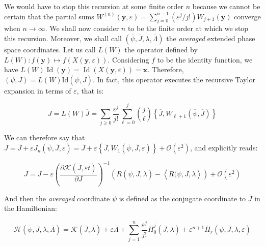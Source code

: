 \vspace*{2.5pt}

\quad We would have to stop this recursion at some finite order $n$ because we cannot be certain that the partial sums $W^{(n)}(\mathbf{y},\varepsilon)=\sum_{j=0}^{n-1}\left(\varepsilon^j/j!\right)W_{j+1}(\mathbf{y})$ converge when $n\to\infty$. We shall now consider $n$ to be the finite order at which we stop this recursion. Moreover, we shall call $(\overline{\psi},\overline{J},\lambda,\overline{\Lambda})$ the \textit{averaged} extended phase space coordinates. Let us call $L(W)$ the operator defined by $L(W):f(\mathbf{y})\mapsto f(X(\mathbf{y},\varepsilon))$. Considering $f$ to be the identity function, we have ${L(W)}{\operatorname{{Id}}{(\mathbf{y})}}=\operatorname{{Id}}{\left(X(\mathbf{y},\varepsilon)\right)}=\mathbf{x}$. Therefore, $(\psi, J)=L(W)\mathrm{Id}(\overline{\psi}, \overline{J})$. In fact, this operator executes the recursive Taylor expansion in terms of $\varepsilon$, that is:

\begin{equation}
    J=L(W)\overline{J}=\sum_{j\geq0}\frac{\varepsilon^j}{j!}\sum_{\ell=0}^j\binom{j}{\ell}\left\{\overline{J},W_{\ell+1}(\overline{\psi},\overline{J})\right\}
\end{equation}

We can therefore say that $J=\overline{J}+\varepsilon J_n(\overline{\psi},\overline{J},\varepsilon)=\overline{J}+\varepsilon \left\{\overline{J},W_1(\overline{\psi},\overline{J},\varepsilon)\right\}+\mathcal{O}(\varepsilon^2)$, and explicitly reads:

\begin{equation}
    \label{H-34}
    J=\overline{J}-\varepsilon \left(\frac{\partial \mathcal{K}(\overline{J},\varepsilon t)}{\partial J}\right)^{-1}\left(R(\overline{\psi},\overline{J},\lambda)-\left\langle R(\overline{\psi},\overline{J},\lambda\right\rangle\right)+\mathcal{O}(\varepsilon^2)
\end{equation}

And then the \textit{averaged} coordinate $\overline{\psi}$ is defined as the conjugate coordinate to $\overline{J}$ in the Hamiltonian:

\begin{equation}
    \label{H-35}
    \overline{\mathcal{H}}(\overline{\psi},\overline{J},\lambda,\overline{\Lambda})=\mathcal{K}(\overline{J},\lambda)+\varepsilon\overline{\Lambda}+\sum_{j=1}^n \frac{\varepsilon^j}{j!}\overline{H}^j_0(\overline{J},\lambda)+\varepsilon^{n+1}\overline{H}_r(\overline{\psi},\overline{J},\lambda,\varepsilon)
\end{equation}

